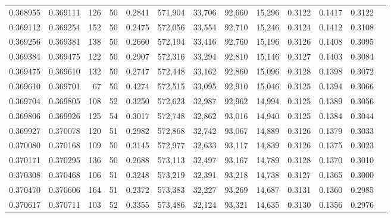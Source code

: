 \begin{tabular}{rrrrrrrrrrrrr}
0.368955 & 0.369111 &   126 &  50 &                                     0.2841 & 571,904 &  33,706 &  92,660 &  15,296 & 0.3122 & 0.1417 & 0.3122 \\
0.369112 & 0.369254 &   152 &  50 &                                     0.2475 & 572,056 &  33,554 &  92,710 &  15,246 & 0.3124 & 0.1412 & 0.3108 \\
0.369256 & 0.369381 &   138 &  50 &                                     0.2660 & 572,194 &  33,416 &  92,760 &  15,196 & 0.3126 & 0.1408 & 0.3095 \\
0.369384 & 0.369475 &   122 &  50 &                                     0.2907 & 572,316 &  33,294 &  92,810 &  15,146 & 0.3127 & 0.1403 & 0.3084 \\
0.369475 & 0.369610 &   132 &  50 &                                     0.2747 & 572,448 &  33,162 &  92,860 &  15,096 & 0.3128 & 0.1398 & 0.3072 \\
0.369610 & 0.369701 &    67 &  50 &                                     0.4274 & 572,515 &  33,095 &  92,910 &  15,046 & 0.3125 & 0.1394 & 0.3066 \\
0.369704 & 0.369805 &   108 &  52 &                                     0.3250 & 572,623 &  32,987 &  92,962 &  14,994 & 0.3125 & 0.1389 & 0.3056 \\
0.369806 & 0.369926 &   125 &  54 &                                     0.3017 & 572,748 &  32,862 &  93,016 &  14,940 & 0.3125 & 0.1384 & 0.3044 \\
0.369927 & 0.370078 &   120 &  51 &                                     0.2982 & 572,868 &  32,742 &  93,067 &  14,889 & 0.3126 & 0.1379 & 0.3033 \\
0.370080 & 0.370168 &   109 &  50 &                                     0.3145 & 572,977 &  32,633 &  93,117 &  14,839 & 0.3126 & 0.1375 & 0.3023 \\
0.370171 & 0.370295 &   136 &  50 &                                     0.2688 & 573,113 &  32,497 &  93,167 &  14,789 & 0.3128 & 0.1370 & 0.3010 \\
0.370308 & 0.370468 &   106 &  51 &                                     0.3248 & 573,219 &  32,391 &  93,218 &  14,738 & 0.3127 & 0.1365 & 0.3000 \\
0.370470 & 0.370606 &   164 &  51 &                                     0.2372 & 573,383 &  32,227 &  93,269 &  14,687 & 0.3131 & 0.1360 & 0.2985 \\
0.370617 & 0.370711 &   103 &  52 &                                     0.3355 & 573,486 &  32,124 &  93,321 &  14,635 & 0.3130 & 0.1356 & 0.2976 \\

\end{tabular}
